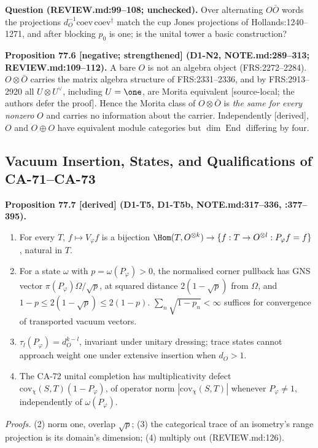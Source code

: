 \textbf{Question (REVIEW.md:99--108; unchecked).}  Over alternating \(O\bar O\) words the
projections \(d_O^{-1}\mathrm{coev}\,\mathrm{coev}^\dagger\) match the cup Jones projections
of Hollands:1240--1271, and after blocking \(p_0\) is one; is the unital tower a basic construction?

\textbf{Proposition 77.6 [negative; strengthened] (D1-N2, NOTE.md:289--313;
REVIEW.md:109--112).}  A bare \(O\) is not an algebra object (FRS:2272--2284).
\(O\otimes\bar O\) carries the matrix algebra structure of FRS:2331--2336, and by
FRS:2913--2920 all \(U\otimes U^\vee\), including \(U=\one\), are Morita
equivalent [source-local; the authors defer the proof].  Hence the Morita class of
\(O\otimes\bar O\) is \emph{the same for every nonzero} \(O\) and carries no
information about the carrier.  Independently [derived], \(O\) and \(O\oplus O\)
have equivalent module categories but \(\dim\operatorname{End}\) differing by four.

\subsection{Vacuum Insertion, States, and Qualifications of CA-71--CA-73}

\textbf{Proposition 77.7 [derived] (D1-T5, D1-T5b, NOTE.md:317--336, :377--395).}
\begin{enumerate}
\item For every \(T\), \(f\mapsto V_\varphi f\) is a bijection
\(\Hom(T,O^{\otimes k})\to\{f:T\to O^{\otimes l}:P_\varphi f=f\}\), natural in \(T\).
\item For a state \(\omega\) with \(p=\omega(P_\varphi)>0\), the normalised
corner pullback has GNS vector \(\pi(P_\varphi)\Omega/\sqrt p\), at squared
distance \(2(1-\sqrt p)\) from \(\Omega\), and \(1-p\le2(1-\sqrt p)\le2(1-p)\).
\(\sum_n\sqrt{1-p_n}<\infty\) suffices for convergence of transported vacuum vectors.
\item \(\tau_l(P_\varphi)=d_O^{k-l}\), invariant under unitary dressing; trace
states cannot approach weight one under extensive insertion when \(d_O>1\).
\item The CA-72 unital completion has multiplicativity defect
\(\mathrm{cov}_\chi(S,T)(1-P_\varphi)\), of operator norm \(|\mathrm{cov}_\chi(S,T)|\)
whenever \(P_\varphi\ne1\), independently of \(\omega(P_\varphi)\).
\end{enumerate}
\emph{Proofs.}  (2) norm one, overlap \(\sqrt p\); (3) the categorical trace of an
isometry's range projection is its domain's dimension; (4) multiply out (REVIEW.md:126).

